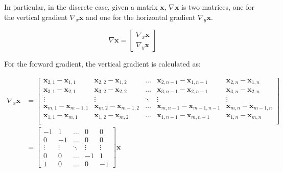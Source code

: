 \documentclass[12pt]{article}
\begin{document}
In particular, in the discrete case, given a matrix $\mathbf{x}$, $\nabla \mathbf{x}$ is two matrices, one for the vertical gradient $\nabla_{x} \mathbf{x}$ and one for the horizontal gradient $\nabla_{y} \mathbf{x}$.

\begin{equation}
  \nabla \mathbf{x} = \begin{bmatrix}
    \nabla_{x} \mathbf{x} \\
    \nabla_{y} \mathbf{x}
  \end{bmatrix}
\end{equation}



For the forward gradient, the vertical gradient is calculated as:

\begin{equation}
  \begin{align}
  \nabla_{x} \mathbf{x} &= \begin{bmatrix}
    \mathbf{x}_{2,1} - \mathbf{x}_{1,1} & \mathbf{x}_{2, 2} - \mathbf{x}_{1, 2} & \ldots & \mathbf{x}_{2, n-1} - \mathbf{x}_{1, n-1} & \mathbf{x}_{2, n} - \mathbf{x}_{1, n} \\
    \mathbf{x}_{3,1} - \mathbf{x}_{2,1} & \mathbf{x}_{3, 2} - \mathbf{x}_{2, 2} & \ldots & \mathbf{x}_{3, n-1} - \mathbf{x}_{2, n-1} & \mathbf{x}_{3, n} - \mathbf{x}_{2, n}  \\
    \vdots & \vdots & \ddots & \vdots & \vdots \\
    \mathbf{x}_{m,1} - \mathbf{x}_{m-1,1} & \mathbf{x}_{m, 2} - \mathbf{x}_{m-1, 2} & \ldots & \mathbf{x}_{m, n-1} - \mathbf{x}_{m-1, n-1} & \mathbf{x}_{m, n} - \mathbf{x}_{m-1, n} \\
    \mathbf{x}_{1, 1} - \mathbf{x}_{m, 1} & \mathbf{x}_{1, 2} - \mathbf{x}_{m, 2} & \ldots & \mathbf{x}_{1, n-1} - \mathbf{x}_{m, n-1} & \mathbf{x}_{1, n} - \mathbf{x}_{m, n} \\
  \end{bmatrix} \\
  &= \begin{bmatrix}
    -1 & 1 & \ldots & 0 & 0 \\
    0 & -1 & \ldots & 0 & 0 \\
     \vdots & \vdots & \ddots & \vdots & \vdots \\
    0 & 0 & \ldots & -1 & 1 \\
    1 & 0 & \ldots & 0 & -1
    \end{bmatrix} \mathbf{x}
  \end{align}
\end{equation}
\end{document}
